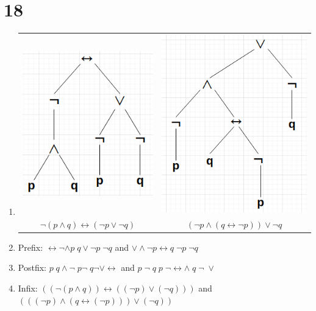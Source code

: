 \documentclass[12pt]{article}
\begin{document}
    \section*{18}
      \begin{enumerate}[label=\alph*)]
        \item 
          \begin{center}
            \begin{tabular}{cc}
              \includegraphics{18a1.png}
              &
              \includegraphics{18a2.png} \\
              \(\neg(p\wedge q)\leftrightarrow(\neg p \vee \neg q)\)
              &
              \((\neg p \wedge (q \leftrightarrow \neg p))\vee \neg q\)
            \end{tabular}
          \end{center}
        \item Prefix: \(\leftrightarrow \neg \wedge p \; q \vee \neg p \; \neg q\) and \(\vee \wedge \neg p \leftrightarrow q \; \neg p \; \neg q\)
        \item Postfix: \(p \; q \wedge \neg \;p \neg \; q \neg \vee \leftrightarrow\) and \(p \; \neg \; q \; p \; \neg \leftrightarrow \wedge \; q \; \neg \; \vee \)
        \item Infix: \(((\neg(p\wedge q))\leftrightarrow((\neg p) \vee (\neg q)))\) and \((((\neg p) \wedge (q \leftrightarrow (\neg p)))\vee (\neg q))\)
      \end{enumerate}
\end{document}
